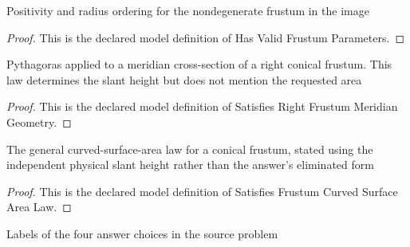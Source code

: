 \begin{definition}
  \label{def:physics:phyx-mini-0666:phyxminiproblems-problemphyxmini0666-hasvalidfrustumparameters}
  Positivity and radius ordering for the nondegenerate frustum in the image
\end{definition}
\begin{proof}
  This is the declared model definition of Has Valid Frustum Parameters.
\end{proof}
\begin{definition}
  \label{def:physics:phyx-mini-0666:phyxminiproblems-problemphyxmini0666-satisfiesrightfrustummeridiangeometry}
  Pythagoras applied to a meridian cross-section of a right conical frustum. This law determines the slant height but does not mention the requested area
\end{definition}
\begin{proof}
  This is the declared model definition of Satisfies Right Frustum Meridian Geometry.
\end{proof}
\begin{definition}
  \label{def:physics:phyx-mini-0666:phyxminiproblems-problemphyxmini0666-satisfiesfrustumcurvedsurfacearealaw}
  The general curved-surface-area law for a conical frustum, stated using the independent physical slant height rather than the answer's eliminated form
\end{definition}
\begin{proof}
  This is the declared model definition of Satisfies Frustum Curved Surface Area Law.
\end{proof}
\begin{definition}
  \label{def:physics:phyx-mini-0666:phyxminiproblems-problemphyxmini0666-answerchoice}
  Labels of the four answer choices in the source problem
\end{definition}
